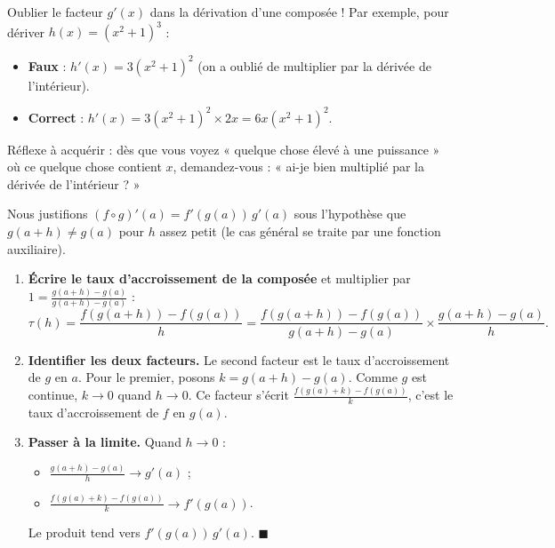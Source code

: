 \documentclass[11pt]{article}
\begin{document}
\begin{attention}
Oublier le facteur $g'(x)$ dans la dérivation d'une composée ! Par exemple, pour dériver $h(x) = (x^2 + 1)^3$ :
\begin{itemize}
\item \textbf{Faux} : $h'(x) = 3(x^2+1)^2$ (on a oublié de multiplier par la dérivée de l'intérieur).
\item \textbf{Correct} : $h'(x) = 3(x^2+1)^2 \times 2x = 6x(x^2+1)^2$.
\end{itemize}
Réflexe à acquérir : dès que vous voyez « quelque chose élevé à une puissance » où ce quelque chose contient $x$, demandez-vous : « ai-je bien multiplié par la dérivée de l'intérieur ? »
\end{attention}

\begin{experience}
Nous justifions $(f \circ g)'(a) = f'(g(a))\,g'(a)$ sous l'hypothèse que $g(a+h) \neq g(a)$ pour $h$ assez petit (le cas général se traite par une fonction auxiliaire).

\begin{enumerate}
\item \textbf{Écrire le taux d'accroissement de la composée} et multiplier par $1 = \frac{g(a+h)-g(a)}{g(a+h)-g(a)}$ :
\[ \tau(h) = \frac{f(g(a+h)) - f(g(a))}{h} = \frac{f(g(a+h)) - f(g(a))}{g(a+h)-g(a)} \times \frac{g(a+h)-g(a)}{h}. \]
\item \textbf{Identifier les deux facteurs.} Le second facteur est le taux d'accroissement de $g$ en $a$. Pour le premier, posons $k = g(a+h)-g(a)$. Comme $g$ est continue, $k \to 0$ quand $h \to 0$. Ce facteur s'écrit $\frac{f(g(a)+k) - f(g(a))}{k}$, c'est le taux d'accroissement de $f$ en $g(a)$.
\item \textbf{Passer à la limite.} Quand $h \to 0$ :
\begin{itemize}
\item $\frac{g(a+h)-g(a)}{h} \to g'(a)$ ;
\item $\frac{f(g(a)+k) - f(g(a))}{k} \to f'(g(a))$.
\end{itemize}
Le produit tend vers $f'(g(a))\,g'(a)$. \hfill $\blacksquare$
\end{enumerate}
\end{experience}
\end{document}
